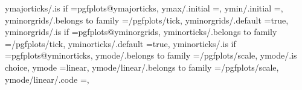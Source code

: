 {{{{{{{{{{{ymajorticks/.is if                                                 =pgfplots@ymajorticks,                                                                                                              
ymax/.initial                                                      =,                                                                                                                                  
ymin/.initial                                                      =,                                                                                                                                  
yminorgrids/.belongs to family                                     =/pgfplots/tick,                                                                                                                    
yminorgrids/.default                                               =true,                                                                                                                              
yminorgrids/.is if                                                 =pgfplots@yminorgrids,                                                                                                              
yminorticks/.belongs to family                                     =/pgfplots/tick,                                                                                                                    
yminorticks/.default                                               =true,                                                                                                                              
yminorticks/.is if                                                 =pgfplots@yminorticks,                                                                                                              
ymode/.belongs to family                                           =/pgfplots/scale,                                                                                                                   
ymode/.is choice,
ymode                                                              =linear,                                                                                                                            
ymode/linear/.belongs to family                                    =/pgfplots/scale,                                                                                                                   
ymode/linear/.code                                                 ={\pgfplots@yislineartrue},                                                                                                         
}}}}}}}}}}}
